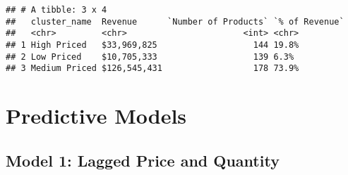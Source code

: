 \documentclass[]{article}
\newenvironment{Shaded}{\begin{snugshade}}{\end{snugshade}}
\newcommand{\KeywordTok}[1]{\textcolor[rgb]{0.13,0.29,0.53}{\textbf{#1}}}
\newcommand{\DataTypeTok}[1]{\textcolor[rgb]{0.13,0.29,0.53}{#1}}
\newcommand{\StringTok}[1]{\textcolor[rgb]{0.31,0.60,0.02}{#1}}
\newcommand{\OperatorTok}[1]{\textcolor[rgb]{0.81,0.36,0.00}{\textbf{#1}}}
\newcommand{\NormalTok}[1]{#1}
\begin{document}
\begin{Shaded}
\end{Shaded}

\begin{verbatim}
## # A tibble: 3 x 4
##   cluster_name  Revenue      `Number of Products` `% of Revenue`
##   <chr>         <chr>                       <int> <chr>         
## 1 High Priced   $33,969,825                   144 19.8%         
## 2 Low Priced    $10,705,333                   139 6.3%          
## 3 Medium Priced $126,545,431                  178 73.9%
\end{verbatim}

\section{Predictive Models}\label{predictive-models}

\subsection{Model 1: Lagged Price and
Quantity}\label{model-1-lagged-price-and-quantity}
\end{document}

